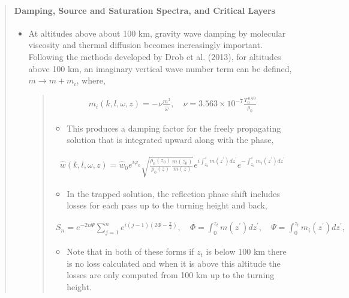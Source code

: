 \documentclass[letterpaper,10pt,english]{sphinxmanual}
\begin{document}
\begin{itemize}
\begin{quote}
\paragraph{Damping, Source and Saturation Spectra, and Critical Layers}
\label{\detokenize{gravity:damping-source-and-saturation-spectra-and-critical-layers}}\begin{itemize}
\item {} 
At altitudes above about 100 km, gravity wave damping by molecular viscosity and thermal diffusion becomes increasingly important.  Following the methods developed by Drob et al. (2013), for altitudes above 100 km, an imaginary vertical wave number term can be defined, \(m \rightarrow m + m_i\), where,
\begin{quote}
\begin{equation*}
\begin{split}m_i \left(k, l, \omega, z \right) = -\nu \frac{m^3}{\hat{\omega}}, \quad \nu = 3.563 \times 10^{-7} \frac{T_0^{\, 0.69}}{\rho_0}\end{split}
\end{equation*}\begin{itemize}
\item {} 
This produces a damping factor for the freely propagating solution that is integrated upward along with the phase,

\end{itemize}
\begin{equation*}
\begin{split}\hat{w} \left( k, l, \omega, z \right) = \hat{w}_0 e^{i \varphi_0} \sqrt{ \frac{\rho_0 \left( z_0 \right)}{\rho_0 \left( z \right)} \frac{m \left( z_0 \right)}{m \left( z \right)}} e^{i \int_{z_0}^z{m \left( z^\prime \right) dz^\prime}} e^{-\int_{z_0}^{z}{m_i \left( z^\prime \right) dz^\prime}}\end{split}
\end{equation*}\begin{itemize}
\item {} 
In the trapped solution, the reflection phase shift includes losses for each pass up to the turning height and back,

\end{itemize}
\begin{equation*}
\begin{split}S_n = e^{-2 n \Psi} \sum_{j = 1}^n{e^{i \left( j -1 \right) \left(2 \Phi - \frac{\pi}{2} \right)}}, \quad \Phi = \int_0^{z_t} m \left( z^\prime \right) d z^\prime, \quad \Psi = \int_0^{z_t} m_i \left( z^\prime \right) d z^\prime,\end{split}
\end{equation*}\begin{itemize}
\item {} 
Note that in both of these forms if \(z_t\) is below 100 km there is no loss calculated and when it is above this altitude the losses are only computed from 100 km up to the turning height.


\end{itemize}
\end{quote}
\end{itemize}
\end{quote}
\end{itemize}
\end{document}
